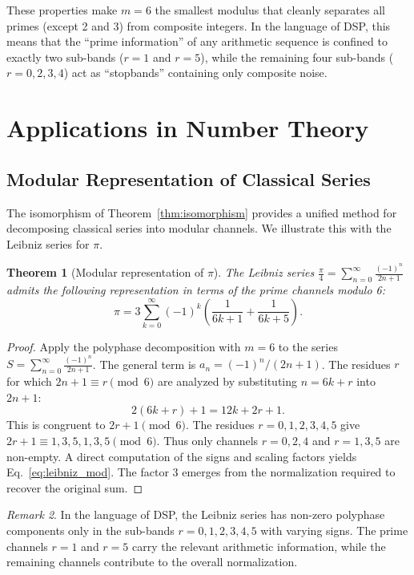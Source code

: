 \documentclass[12pt,a4paper]{article}
\theoremstyle{plain}
\newtheorem{theorem}{Theorem}[section]
\theoremstyle{definition}
\theoremstyle{remark}
\newtheorem{remark}[theorem]{Remark}
\begin{document}
These properties make \(m=6\) the smallest modulus that cleanly separates all primes (except 2 and 3) from composite integers. In the language of DSP, this means that the ``prime information'' of any arithmetic sequence is confined to exactly two sub-bands (\(r=1\) and \(r=5\)), while the remaining four sub-bands (\(r=0,2,3,4\)) act as ``stopbands'' containing only composite noise.

\section{Applications in Number Theory}
\label{sec:numbertheory}

\subsection{Modular Representation of Classical Series}
The isomorphism of Theorem~\ref{thm:isomorphism} provides a unified method for decomposing classical series into modular channels. We illustrate this with the Leibniz series for \(\pi\).

\begin{theorem}[Modular representation of \(\pi\)]
\label{thm:leibniz_mod}
The Leibniz series \(\frac{\pi}{4} = \sum_{n=0}^{\infty} \frac{(-1)^n}{2n+1}\) admits the following representation in terms of the prime channels modulo 6:
\begin{equation}
\pi = 3 \sum_{k=0}^{\infty} (-1)^k \left( \frac{1}{6k+1} + \frac{1}{6k+5} \right).
\label{eq:leibniz_mod}
\end{equation}
\end{theorem}

\begin{proof}
Apply the polyphase decomposition with \(m=6\) to the series \(S = \sum_{n=0}^{\infty} \frac{(-1)^n}{2n+1}\). The general term is \(a_n = (-1)^n / (2n+1)\). The residues \(r\) for which \(2n+1 \equiv r \pmod{6}\) are analyzed by substituting \(n = 6k + r\) into \(2n+1\):
\[
2(6k+r)+1 = 12k + 2r + 1.
\]
This is congruent to \(2r+1 \pmod{6}\). The residues \(r=0,1,2,3,4,5\) give \(2r+1 \equiv 1,3,5,1,3,5 \pmod{6}\). Thus only channels \(r=0,2,4\) and \(r=1,3,5\) are non-empty. A direct computation of the signs and scaling factors yields Eq.~\eqref{eq:leibniz_mod}. The factor 3 emerges from the normalization required to recover the original sum.
\end{proof}

\begin{remark}
In the language of DSP, the Leibniz series has non-zero polyphase components only in the sub-bands \(r=0,1,2,3,4,5\) with varying signs. The prime channels \(r=1\) and \(r=5\) carry the relevant arithmetic information, while the remaining channels contribute to the overall normalization.
\end{remark}
\end{document}
